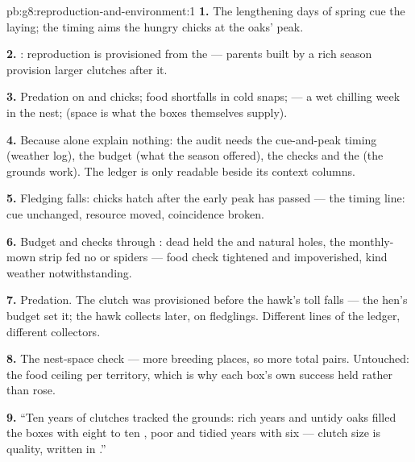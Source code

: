 \begin{solution}{pb:g8:reproduction-and-environment:1}
\textbf{1.} The lengthening days of spring cue the laying;
the timing aims the hungry chicks at the oaks' 
peak.

\textbf{2.} :
reproduction is provisioned from the  --- parents
built by a rich season provision larger clutches after it.

\textbf{3.} Predation on  and chicks; food shortfalls
in cold snaps;  --- a wet chilling week in the
nest; (space is what the boxes themselves supply).

\textbf{4.} Because  alone explain nothing: the audit
needs the cue-and-peak timing (weather log), the budget
(what the season offered), the checks and the 
(the grounds work). The ledger is only readable beside
its context columns.

\textbf{5.} Fledging falls: chicks hatch after the early
peak has passed --- the timing line: cue unchanged,
resource moved, coincidence broken.

\textbf{6.} Budget and checks through : dead 
held the  and natural holes, the monthly-mown
strip fed no  or spiders --- food check
tightened and  impoverished, kind weather
notwithstanding.

\textbf{7.} Predation. The clutch was provisioned before
the hawk's toll falls --- the hen's budget set it; the
hawk collects later, on fledglings. Different lines of
the ledger, different collectors.

\textbf{8.} The nest-space check --- more breeding places,
so more total pairs. Untouched: the food ceiling per
territory, which is why each box's own success held
rather than rose.

\textbf{9.} ``Ten years of clutches tracked the grounds:
rich  years and untidy oaks filled the boxes
with eight to ten , poor and tidied years with six
--- clutch size is  quality, written in .''


\end{solution}
